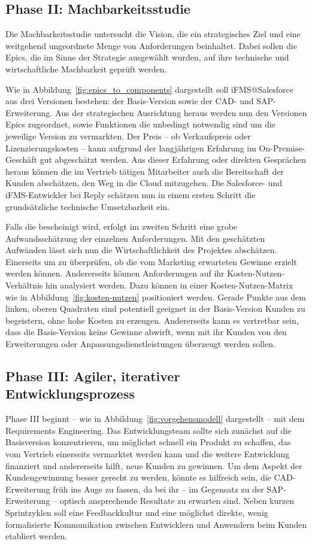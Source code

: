 \subsection{Phase II: Machbarkeitsstudie}
Die Machbarkeitsstudie untersucht die Vision, die ein strategisches Ziel und 
eine weitgehend ungeordnete Menge von Anforderungen beinhaltet. Dabei sollen 
die Epics, die im Sinne der Strategie ausgewählt wurden, auf ihre technische 
und wirtschaftliche Machbarkeit geprüft werden.

Wie in Abbildung~\ref{fig:epics_to_components} dargestellt soll iFMS@Salesforce 
aus drei Versionen bestehen: der Basis-Version sowie der CAD- und 
SAP-Erweiterung. Aus der strategischen Ausrichtung heraus werden nun den 
Versionen Epics zugeordnet, sowie Funktionen die unbedingt notwendig sind um die 
jeweilige Version zu vermarkten. Der Preis -- ob Verkaufspreis oder 
Lizenzierungskosten -- kann aufgrund der langjährigen Erfahrung im 
On-Premise-Geschäft gut abgeschätzt werden. Aus dieser Erfahrung oder direkten 
Gesprächen heraus können die im Vertrieb tätigen Mitarbeiter auch die 
Bereitschaft der Kunden abschätzen, den Weg in die Cloud mitzugehen. Die 
Salesforce- und iFMS-Entwickler bei Reply schätzen nun in einem ersten Schritt 
die grundsätzliche technische Umsetzbarkeit ein.

Falls die bescheinigt wird, erfolgt im zweiten Schritt eine grobe 
Aufwandsschätzung der einzelnen Anforderungen. Mit den geschätzten Aufwänden 
lässt sich nun die Wirtschaftlichkeit des Projektes abschätzen. Einerseits um zu 
überprüfen, ob die vom Marketing erwarteten Gewinne erzielt werden können. 
Andererseits können Anforderungen auf ihr Kosten-Nutzen-Verhältnis hin 
analysiert werden. Dazu können in einer Kosten-Nutzen-Matrix wie in 
Abbildung~\ref{fig:kosten-nutzen} positioniert werden. Gerade Punkte aus dem 
linken, oberen Quadraten sind potentiell geeignet in der Basis-Version Kunden zu 
begeistern, ohne hohe Kosten zu erzeugen.
Andererseits kann es vertretbar sein, dass die Basis-Version keine Gewinne 
abwirft, wenn mit ihr Kunden von den Erweiterungen oder 
Anpassungsdienstleistungen überzeugt werden sollen.

\subsection{Phase III: Agiler, iterativer Entwicklungsprozess}
Phase III beginnt -- wie in Abbildung~\ref{fig:vorgehensmodell} dargestellt -- 
mit dem Requirements Engineering. Das Entwicklungsteam sollte sich zunächst auf 
die Basisversion konzentrieren, um möglichst schnell ein Produkt zu schaffen, 
das vom Vertrieb einerseits vermarktet werden kann und die weitere 
Entwicklung finanziert und andererseits hilft, neue Kunden zu gewinnen. Um dem 
Aspekt der Kundengewinnung besser gerecht zu werden, könnte es hilfreich sein, 
die CAD-Erweiterung früh ins Auge zu fassen, da bei ihr -- im Gegensatz zu der 
SAP-Erweiterung -- optisch ansprechende Resultate zu erwarten sind. 
Neben kurzen Sprintzyklen soll eine Feedbackkultur und eine möglichst direkte, 
wenig formalisierte Kommunikation zwischen Entwicklern und Anwendern beim 
Kunden etabliert werden.